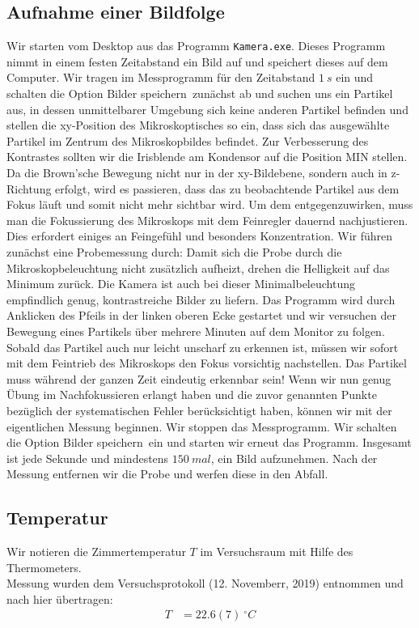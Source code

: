 \documentclass[a4paper,10pt]{article}
\begin{document}
\subsection{Aufnahme einer Bildfolge}
Wir starten vom Desktop aus das Programm \texttt{Kamera.exe}. Dieses Programm nimmt in einem festen Zeitabstand
ein Bild auf und speichert dieses auf dem Computer. Wir tragen im Messprogramm für den Zeitabstand \(1\:s\) ein und schalten die Option \glqq Bilder speichern\grqq~zunächst ab und 
suchen uns ein Partikel aus, in dessen unmittelbarer Umgebung sich keine anderen Partikel befinden und stellen die xy-Position des
Mikroskoptisches so ein, dass sich das ausgewählte Partikel im Zentrum des Mikroskopbildes befindet. Zur Verbesserung des Kontrastes sollten wir die Irisblende am Kondensor auf die Position MIN stellen. Da die Brown'sche Bewegung nicht nur in der xy-Bildebene, sondern auch in z-Richtung erfolgt, wird es passieren, dass das zu beobachtende Partikel
aus dem Fokus läuft und somit nicht mehr sichtbar wird. Um dem entgegenzuwirken, muss man die Fokussierung des Mikroskops mit dem Feinregler dauernd nachjustieren. Dies erfordert einiges an Feingefühl und besonders Konzentration.
Wir führen zunächst eine Probemessung durch: Damit sich die Probe
durch die Mikroskopbeleuchtung nicht zusätzlich aufheizt, drehen die
Helligkeit auf das Minimum zurück. Die Kamera ist auch bei dieser Minimalbeleuchtung empfindlich genug, kontrastreiche Bilder zu liefern. Das Programm wird durch Anklicken des Pfeils in der linken oberen Ecke gestartet und wir versuchen der Bewegung eines Partikels über mehrere Minuten auf dem Monitor zu folgen. Sobald das Partikel auch nur leicht unscharf
zu erkennen ist, müssen wir sofort mit dem Feintrieb des Mikroskops den Fokus vorsichtig nachstellen. Das Partikel muss während der ganzen Zeit eindeutig erkennbar sein! Wenn wir nun genug Übung im Nachfokussieren erlangt haben und die zuvor genannten Punkte bezüglich der systematischen Fehler berücksichtigt haben, können wir mit der eigentlichen Messung beginnen. Wir stoppen das
Messprogramm. Wir schalten die Option \glqq Bilder speichern\grqq~ein und starten
wir erneut das Programm. Insgesamt ist jede Sekunde und mindestens \(150\:mal\), ein Bild aufzunehmen. Nach der Messung entfernen wir die Probe und werfen diese in den Abfall.
\subsection{Temperatur} 
Wir notieren die Zimmertemperatur \(T\) im Versuchsraum mit Hilfe des Thermometers.\\
Messung wurden dem Versuchsprotokoll (12. Novemberr, 2019) entnommen und nach hier übertragen:
\begin{align*}
T&=22.6(7)\:^{\circ}C
\end{align*}
\end{document}
